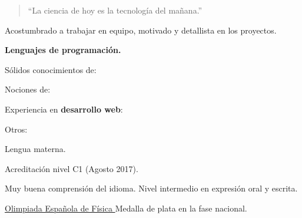 

\begin{quote}
  ``La ciencia de hoy es la tecnología del mañana.''
\end{quote}


Acostumbrado a trabajar en equipo, motivado y detallista en los proyectos.

\divider

\textbf{Lenguajes de programación.} \\ \medskip

Sólidos conocimientos de:

\begin{center}
\end{center}

Nociones de: \quad
{}

\divider

Experiencia en \textbf{desarrollo web}:
\vspace{-.05cm}
\begin{center}
\end{center}
\vspace{-.25cm}

\divider

Otros: \quad
{}
\cvtag{\LaTeX}

\medskip



\smallskip
Lengua materna.
\vspace{-.35cm}
\divider

\smallskip
Acreditación nivel C1 (Agosto 2017).
\vspace{-.35cm}
\divider

\smallskip
Muy buena comprensión del idioma. Nivel intermedio en expresión oral y escrita.

\medskip


\cvachievement{\faTrophy}
{\href{https://rsef.es/olimpiada-espanola-de-fisica}
  {Olimpiada Española de Física \smallskip}}
{\small{}%
  \small{}}
Medalla de plata en la fase nacional.

